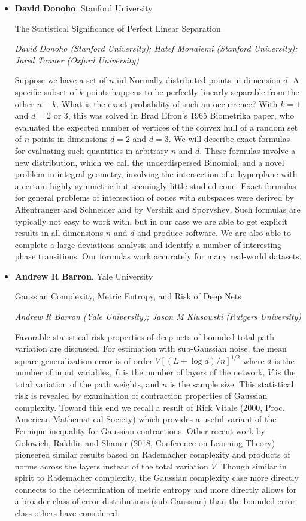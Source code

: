 \begin{itemize}
\item \textbf{David Donoho}, Stanford University

The Statistical Significance of Perfect Linear Separation

\emph{\footnotesize David Donoho (Stanford University); Hatef Monajemi (Stanford University); Jared Tanner (Oxford University)}

Suppose we have a set of $n$ iid Normally-distributed points in dimension $d$. A specific subset of $k$ points happens to be perfectly linearly separable from the other $n-k$. What is the exact probability of such an occurrence? With $k=1$ and $d=2$ or $3$, this was solved in Brad Efron's 1965 Biometrika paper, who evaluated the expected number of vertices of the convex hull of a random set of $n$ points in dimensions $d=2$ and $d=3$. We will describe exact formulas for evaluating such quantities in arbitrary $n$ and $d$. These formulas involve a new distribution, which we call the underdispersed Binomial, and a novel problem in integral geometry, involving the intersection of a hyperplane with a certain highly symmetric but seemingly little-studied cone. Exact formulas for general problems of intersection of cones with subspaces were derived by Affentranger and Schneider and by Vershik and Sporyshev. Such formulas  are typically not easy to work with, but in our case we are able to get explicit results in all dimensions $n$ and $d$ and produce software.  We are also able to complete a large deviations analysis and identify a number of interesting phase transitions. Our formulas work accurately for many real-world datasets.

\item \textbf{Andrew R Barron}, Yale University

Gaussian Complexity, Metric Entropy, and Risk of Deep Nets

\emph{\footnotesize Andrew R Barron (Yale University); Jason M Klusowski (Rutgers University)}

Favorable statistical risk properties of deep nets of bounded total path variation are discussed. For estimation with sub-Gaussian noise, the mean square generalization error is of order $V  [(L + \log d) / n]^{1/2}$ where $d$ is the number of input variables, $L$ is the number of layers of the network, $V$ is the total variation of the path weights, and $n$ is the sample size. This statistical risk is revealed by examination of contraction properties of  Gaussian complexity. Toward this end we recall a result of Rick Vitale (2000, Proc. American Mathematical Society) which provides a useful variant of the Fernique inequality for Gaussian contractions.  Other recent work by Golowich, Rakhlin and Shamir (2018, Conference on Learning Theory) pioneered similar results based on Rademacher complexity and products of norms across the layers instead of the total variation $V$. Though similar in spirit to Rademacher complexity, the Gaussian complexity case more directly connects to the determination of metric entropy and more directly allows for a broader class of error distributions (sub-Gaussian) than the bounded error class others have considered.


\end{itemize}
